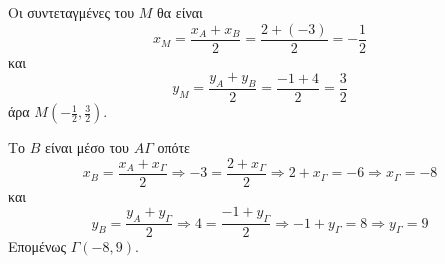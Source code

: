 \begin{alist}
\item Οι συντεταγμένες του $ M $ θα είναι
\[ x_M=\frac{x_A+x_B}{2}=\frac{2+(-3)}{2}=-\frac{1}{2} \]
και 
\[ y_M=\frac{y_A+y_B}{2}=\frac{-1+4}{2}=\frac{3}{2} \]
άρα $ M\left(-\frac{1}{2},\frac{3}{2}\right) $.
\item Το $ B $ είναι μέσο του $ A\varGamma $ οπότε
\[ x_B=\frac{x_A+x_{\varGamma}}{2}\Rightarrow -3=\frac{2+x_{\varGamma}}{2}\Rightarrow 2+x_{\varGamma}=-6\Rightarrow x_{\varGamma}=-8 \]
και 
\[ y_B=\frac{y_A+y_{\varGamma}}{2}\Rightarrow 4=\frac{-1+y_{\varGamma}}{2}\Rightarrow -1+y_{\varGamma}=8\Rightarrow y_{\varGamma}=9 \]
Επομένως $ \varGamma(-8,9) $.
\end{alist}
